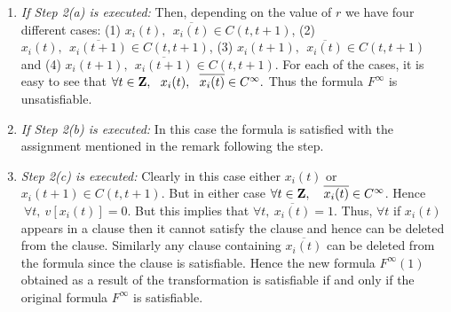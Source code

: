 \begin{enumerate}


\item
{\em If Step 2(a) is  executed:}
Then, depending on the value of $r$ we have four different cases:
(1) $ x_i(t), ~~ \overline{x_i(t)} \in C(t, t+1)$,
(2) $ x_i(t), ~~ \overline{x_i(t+1)} \in C(t, t+1)$, 
(3) $ x_i(t+1), ~~ \overline{x_i(t)} \in C(t, t+1)$ and 
(4) $ x_i(t+1), ~~ \overline{x_i(t+1)} \in C(t, t+1)$.
For each of the cases, it is easy to see that
$\forall t \in {\bf Z}, ~~  x_i(t), ~~ \overline{x_i(t)} \in C^{\infty}.$
Thus the formula $F^{\infty}$ is unsatisfiable.

\item
{\em If Step 2(b) is  executed:}
In this case the formula is satisfied with the assignment mentioned in the 
remark following the step.

\item
{\em Step 2(c) is executed:} 
Clearly in this case either
$x_i(t)$ or $x_i(t+1) \in C(t, t+1)$. But in either case
$\forall t \in {\bf Z}, ~~~  \overline{x_i(t)} \in C^{\infty}$. 
Hence  $~\forall t, ~ v[x_i(t)] = 0$. But this implies that 
$\forall t, ~ \overline{x_i(t)} = 1$. 
Thus, $\forall t$ if  $x_i(t)$
appears in a clause then it cannot satisfy the clause and hence
can be deleted from the clause. Similarly
any clause containing $\overline{x_i(t)}$ 
can be deleted from the formula since the 
clause is satisfiable. 
Hence the new formula $F^{\infty}(1)$ obtained as a
result of the transformation is satisfiable if and only if the original
formula $F^{\infty}$ is satisfiable.



\iffalse******
\begin{enumerate}
\item
The single literal clause is $x_i(t)$. Then, clearly 
$\forall t \in {\bf Z}, ~~~  x_i(t) \in C^{\infty}$. Hence 
$\forall t, ~~~ x_i(t) = 1$. But this implies that 
$\forall t, ~~~ \overline{x_i(t)} = 0$. 
Thus, if $\forall t \overline{x_i(t)}$
appears in a clause then it cannot satisfy the clause and hence
can be deleted from the clause. Similarly
any clause containing $x_i(t)$ can be deleted from the formula since the 
clause is satisfiable. Hence the new formula $F^{\infty}(1)$ obtained as a
result of the transformation is satisfiable if and only if the original
formula $F^{\infty}$ is satisfiable.


\item

The single literal clause is $x_i(t+1)$. 
Then by arguments similar to the ones given for Case 1, we get that
the new transformed formula is satisfiable if and only if the original formula
is satisfiable.
\end{enumerate}

***************
\fi

\end{enumerate}

